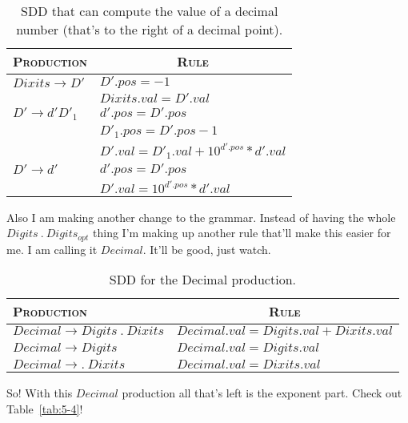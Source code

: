 \begin{table}[H]
	\centering
	\begin{tabular}{l|l}
	\hline	\hline
	\textsc{Production}			& \multicolumn{1}{c}{\textsc{Rule}} \\ \hline
	$Dixits\rightarrow D'$	& $D'.pos = -1$ \\ 
							& $Dixits.val = D'.val$ \\ \hline
	$D'\rightarrow d'D'_1$	& $d'.pos = D'.pos$	\\
							& $D'_1.pos = D'.pos - 1$ \\
							& $D'.val = D'_1.val + 10^{d'.pos}*d'.val$ \\ \hline
	$D'\rightarrow d'$		& $d'.pos = D'.pos$	\\
							& $D'.val = 10^{d'.pos}*d'.val$\\

	\hline
	\end{tabular}	
	\caption{SDD that can compute the value of a decimal number (that's to the right of a decimal point).}
	\label{tab:5-2}
\end{table}

Also I am making another change to the grammar.
Instead of having the whole $Digits~.~Digits_{opt}$ thing I'm making up another rule that'll make this easier for me.
I am calling it $Decimal$.
It'll be good, just watch.

\begin{table}[H]
	\centering
	\begin{tabular}{l|l}
	\hline	\hline
	\textsc{Production}						& \multicolumn{1}{c}{\textsc{Rule}} \\ \hline
	$Decimal\rightarrow Digits~.~Dixits$	& $Decimal.val = Digits.val + Dixits.val$ \\ \hline
	$Decimal\rightarrow Digits$				& $Decimal.val = Digits.val$ \\ \hline
	$Decimal\rightarrow .~Dixits$			& $Decimal.val = Dixits.val$ \\
	\hline
	\end{tabular}	
	\caption{SDD for the Decimal production.}
	\label{tab:5-3}
\end{table}

So!
With this $Decimal$ production all that's left is the exponent part.
Check out Table~\ref{tab:5-4}!

